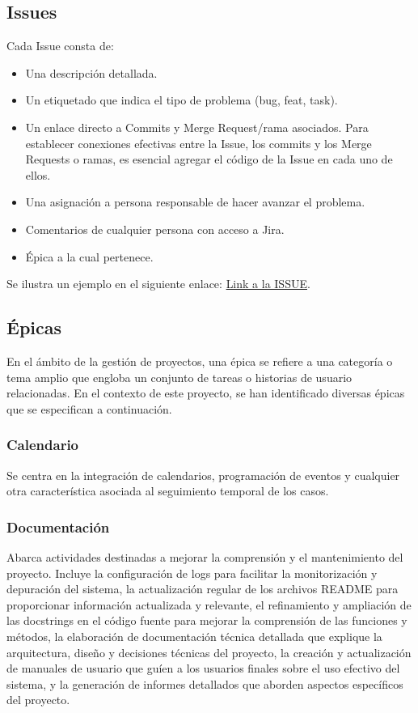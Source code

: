 \subsection{Issues}
Cada Issue consta de:
\begin{itemize}
    \item Una descripción detallada.
    \item Un etiquetado que indica el tipo de problema (bug, feat, task).
    \item Un enlace directo a Commits y Merge Request/rama asociados. Para establecer conexiones efectivas entre la Issue, los commits y los Merge Requests o ramas, es esencial agregar el código de la Issue en cada uno de ellos.
    \item Una asignación a persona responsable de hacer avanzar el problema.
    \item Comentarios de cualquier persona con acceso a Jira.
    \item Épica a la cual pertenece.
\end{itemize}
Se ilustra un ejemplo en el siguiente enlace: \href{https://prietojulii.atlassian.net/browse/PAT-44}{Link a la ISSUE}.

\subsection{Épicas}
En el ámbito de la gestión de proyectos, una épica se refiere a una categoría o tema amplio que engloba un conjunto de tareas o historias de usuario relacionadas.
En el contexto de este proyecto, se han identificado diversas épicas que se especifican a continuación.


\subsubsection{Calendario}
Se centra en la integración de calendarios, programación de eventos y cualquier otra característica asociada al seguimiento temporal de los casos.

\subsubsection{Documentación}
Abarca actividades destinadas a mejorar la comprensión y el mantenimiento del proyecto. Incluye la configuración de logs para facilitar la monitorización y depuración del sistema, la actualización regular de los archivos README para proporcionar información actualizada y relevante, el refinamiento y ampliación de las docstrings en el código fuente para mejorar la comprensión de las funciones y métodos, la elaboración de documentación técnica detallada que explique la arquitectura, diseño y decisiones técnicas del proyecto, la creación y actualización de manuales de usuario que guíen a los usuarios finales sobre el uso efectivo del sistema, y la generación de informes detallados que aborden aspectos específicos del proyecto.

